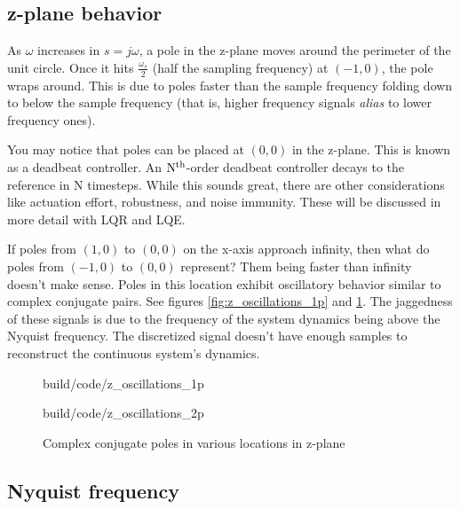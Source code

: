 \subsection{z-plane behavior}

As $\omega$ increases in $s = j\omega$, a pole in the z-plane moves around the
perimeter of the unit circle. Once it hits $\frac{\omega_s}{2}$ (half the
sampling frequency) at $(-1, 0)$, the pole wraps around. This is due to poles
faster than the sample frequency folding down to below the sample frequency
(that is, higher frequency signals \textit{alias} to lower frequency ones).

You may notice that poles can be placed at $(0, 0)$ in the z-plane. This is
known as a deadbeat controller. An $\rm N^{th}$-order deadbeat controller decays
to the \gls{reference} in N timesteps. While this sounds great, there are other
considerations like actuation effort, \gls{robustness}, and
\gls{noise immunity}. These will be discussed in more detail with LQR and LQE.

If poles from $(1, 0)$ to $(0, 0)$ on the x-axis approach infinity, then what do
poles from $(-1, 0)$ to $(0, 0)$ represent? Them being faster than infinity
doesn't make sense. Poles in this location exhibit oscillatory behavior similar
to complex conjugate pairs. See figures \ref{fig:z_oscillations_1p} and
\ref{fig:z_oscillations_2p}. The jaggedness of these signals is due to the
frequency of the system dynamics being above the Nyquist frequency. The
discretized signal doesn't have enough samples to reconstruct the continuous
system's dynamics.

\begin{figure}
  \begin{minisvg}{build/code/z_oscillations_1p}
    \caption{Single poles in various locations in z-plane}
    \label{fig:z_oscillations_1p}
  \end{minisvg}
  \hfill
  \begin{minisvg}{build/code/z_oscillations_2p}
    \caption{Complex conjugate poles in various locations in z-plane}
    \label{fig:z_oscillations_2p}
  \end{minisvg}
\end{figure}

\subsection{Nyquist frequency}

